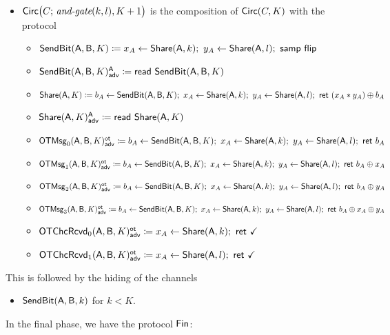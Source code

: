 \begin{itemize}
\item $\mathsf{Circ}\big(C; \, \textit{and-gate}(k,l),K+1\big)$ is the composition of $\mathsf{Circ}(C,K)$ with the protocol
\begin{itemize}
\item $\SendBit(\A,\B,K) \coloneqq x_A \leftarrow \Share(\A,k); \ y_A \leftarrow \Share(\A,l); \ \samp{\flip}$
\item {\color{blue} $\mathsf{SendBit}(\mathsf{A},\mathsf{B},K)^{\mathsf{A}}_{\mathsf{adv}} \coloneqq \mathsf{read} \ \mathsf{SendBit}(\mathsf{A},\mathsf{B},K)$}\smallskip
\item $\mathsf{Share}(\mathsf{A},K) \coloneqq b_A \leftarrow \mathsf{SendBit}(\mathsf{A},\mathsf{B},K); \ x_A \leftarrow \mathsf{Share}(\mathsf{A},k); \ y_A \leftarrow \mathsf{Share}(\mathsf{A},l); \ \mathsf{ret} \ (x_A * y_A) \oplus b_A$
\item {\color{blue} $\mathsf{Share}(\mathsf{A},K)^{\mathsf{A}}_{\mathsf{adv}} \coloneqq \mathsf{read} \ \mathsf{Share}(\mathsf{A},K)$}\smallskip
\item {\color{blue} $\LeakOTMsg_0(\A,\B,K)^\ot_\adv \coloneqq b_A \leftarrow \SendBit(\A,\B,K); \ x_A \leftarrow \Share(\A,k); \ y_A \leftarrow \Share(\A,l); \ \ret{b_A}$}
\item {\color{blue} $\mathsf{OTMsg}_1(\mathsf{A},\mathsf{B},K)^{\mathsf{ot}}_{\mathsf{adv}} \coloneqq b_A \leftarrow \mathsf{SendBit}(\mathsf{A},\mathsf{B},K); \ x_A \leftarrow \mathsf{Share}(\mathsf{A},k); \ y_A \leftarrow \mathsf{Share}(\mathsf{A},l); \ \mathsf{ret} \ b_A \oplus x_A$}
\item {\color{blue} $\mathsf{OTMsg}_2(\mathsf{A},\mathsf{B},K)^{\mathsf{ot}}_{\mathsf{adv}} \coloneqq b_A \leftarrow \mathsf{SendBit}(\mathsf{A},\mathsf{B},K); \ x_A \leftarrow \mathsf{Share}(\mathsf{A},k); \ y_A \leftarrow \mathsf{Share}(\mathsf{A},l); \ \mathsf{ret} \ b_A \oplus y_A$}
\item {\color{blue} $\mathsf{OTMsg}_3(\mathsf{A},\mathsf{B},K)^{\mathsf{ot}}_{\mathsf{adv}} \coloneqq b_A \leftarrow \mathsf{SendBit}(\mathsf{A},\mathsf{B},K); \ x_A \leftarrow \mathsf{Share}(\mathsf{A},k); \ y_A \leftarrow \mathsf{Share}(\mathsf{A},l); \ \mathsf{ret} \ b_A \oplus x_A \oplus y_A$}\smallskip
\item {\color{blue} $\mathsf{OTChcRcvd}_0(\mathsf{A},\mathsf{B},K)^{\mathsf{ot}}_{\mathsf{adv}} \coloneqq x_A \leftarrow \mathsf{Share}(\mathsf{A},k); \ \mathsf{ret} \ \checkmark$}
\item {\color{blue} $\mathsf{OTChcRcvd}_1(\mathsf{A},\mathsf{B},K)^{\mathsf{ot}}_{\mathsf{adv}} \coloneqq x_A \leftarrow \mathsf{Share}(\mathsf{A},l); \ \mathsf{ret} \ \checkmark$}
\end{itemize}
\end{itemize}
This is followed by the hiding of the channels
\begin{itemize}
\item $\mathsf{SendBit}(\mathsf{A},\mathsf{B},k)$ for $k < K$.
\end{itemize}

\noindent In the final phase, we have the protocol $\mathsf{Fin}$:

